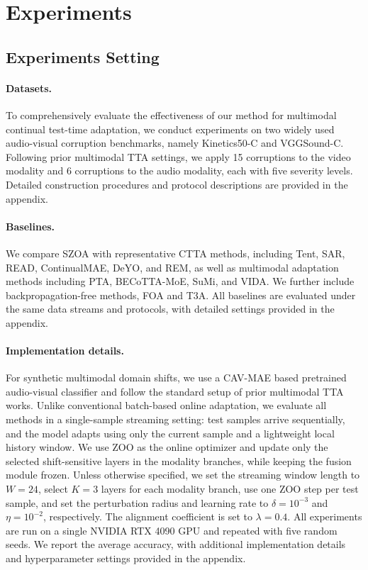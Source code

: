 \section{Experiments}

\subsection{Experiments Setting}

\paragraph{Datasets.}
To comprehensively evaluate the effectiveness of our method for multimodal continual test-time adaptation, we conduct experiments on two widely used audio-visual corruption benchmarks, namely Kinetics50-C and VGGSound-C.
Following prior multimodal TTA settings, we apply 15 corruptions to the video modality and 6 corruptions to the audio modality, each with five severity levels.
Detailed construction procedures and protocol descriptions are provided in the appendix.

\paragraph{Baselines.}
We compare SZOA with representative CTTA methods, including Tent, SAR, READ, ContinualMAE, DeYO, and REM, as well as multimodal adaptation methods including PTA, BECoTTA-MoE, SuMi, and VIDA.
We further include backpropagation-free methods, FOA and T3A.
All baselines are evaluated under the same data streams and protocols, with detailed settings provided in the appendix.


\paragraph{Implementation details.}
For synthetic multimodal domain shifts, we use a CAV-MAE based pretrained audio-visual classifier and follow the standard setup of prior multimodal TTA works.
Unlike conventional batch-based online adaptation, we evaluate all methods in a single-sample streaming setting: test samples arrive sequentially, and the model adapts using only the current sample and a lightweight local history window.
We use ZOO as the online optimizer and update only the selected shift-sensitive layers in the modality branches, while keeping the fusion module frozen.
Unless otherwise specified, we set the streaming window length to $W=24$, select $K=3$ layers for each modality branch, use one ZOO step per test sample, and set the perturbation radius and learning rate to $\delta=10^{-3}$ and $\eta=10^{-2}$, respectively.
The alignment coefficient is set to $\lambda=0.4$.
All experiments are run on a single NVIDIA RTX 4090 GPU and repeated with five random seeds.
We report the average accuracy, with additional implementation details and hyperparameter settings provided in the appendix.


